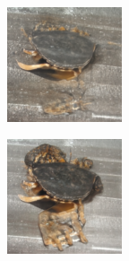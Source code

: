 \documentclass{article}
\begin{document}
\begin{figure}
    \begin{subfigure}[b]{0.5\linewidth}
        \begin{subfigure}[b]{0.242\linewidth}
        \includegraphics[width=\linewidth]{figures/imagenet128/solver_samples/imagenet128_fm_ot_247_05.png}
        \end{subfigure}%
        \begin{subfigure}[b]{0.242\linewidth}
        \includegraphics[width=\linewidth]{figures/imagenet128/solver_samples/imagenet128_fm_ot_247_10.png}

\end{subfigure}
\end{subfigure}
\end{figure}
\end{document}
